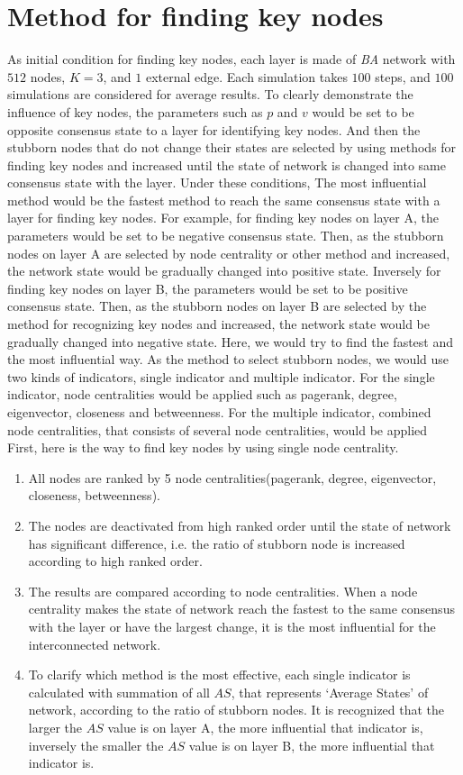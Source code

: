 \section{Method for finding key nodes}
\label{sec:method for finding key nodes}
As initial condition for finding key nodes, each layer is made of \textit{BA} network with $512$ nodes, $K=3$, and $1$ external edge. Each simulation takes $100$ steps, and $100$ simulations are considered for average results. To clearly demonstrate the influence of key nodes, the parameters such as $p$ and $v$ would be set to be opposite consensus state to a layer for identifying key nodes. And then the stubborn nodes that do not change their states are selected by using methods for finding key nodes and increased until the state of network is changed into same consensus state with the layer. Under these conditions, The most influential method would be the fastest method to reach the same consensus state with a layer for finding key nodes. For example, for finding key nodes on layer A, the parameters would be set to be negative consensus state. Then, as the stubborn nodes on layer A are selected by node centrality or other method and increased, the network state would be gradually changed into positive state. Inversely for finding key nodes on layer B, the parameters would be set to be positive consensus state. Then, as the stubborn nodes on layer B are selected by the method for recognizing key nodes and increased, the network state would be gradually changed into negative state. Here, we would try to find the fastest and the most influential way.
As the method to select stubborn nodes, we would use two kinds of indicators, single indicator and multiple indicator. For the single indicator, node centralities would be applied such as pagerank, degree, eigenvector, closeness and betweenness. For the multiple indicator, combined node centralities, that consists of several node centralities, would be applied   
First, here is the way to find key nodes by using single node centrality.
\begin{enumerate}
	\item All nodes are ranked by 5 node centralities(pagerank, degree, eigenvector, closeness, betweenness).
	\item The nodes are deactivated from high ranked order until the state of network has significant difference, i.e. the ratio of stubborn node is increased according to high ranked order. 
	\item The results are compared according to node centralities. When a node centrality makes the state of network reach the fastest to the same consensus with the layer or have the largest change, it is the most influential for the interconnected network.
	\item To clarify which method is the most effective, each single indicator is calculated with summation of all $AS$, that represents `Average States' of network, according to the ratio of stubborn nodes. It is recognized that the larger the $AS$ value is on layer A, the more influential that indicator is, inversely the smaller the $AS$ value is on layer B, the more influential that indicator is.
\end{enumerate}
